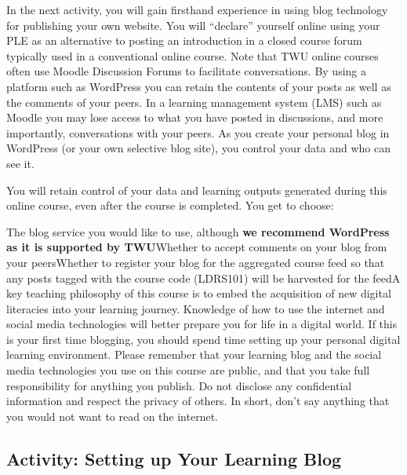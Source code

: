 \documentclass[
  letterpaper,
  DIV=11,
  numbers=noendperiod]{scrreprt}
\begin{document}
In the next activity, you will gain firsthand experience in using blog
technology for publishing your own website. You will ``declare''
yourself online using your PLE as an alternative to posting an
introduction in a closed course forum typically used in a conventional
online course. Note that TWU online courses often use Moodle Discussion
Forums to facilitate conversations. By using a platform such as
WordPress you can retain the contents of your posts as well as the
comments of your peers. In a learning management system (LMS) such as
Moodle you may lose access to what you have posted in discussions, and
more importantly, conversations with your peers. As you create your
personal blog in WordPress (or your own selective blog site), you
control your data and who can see it.

You will retain control of your data and learning outputs generated
during this online course, even after the course is completed. You get
to choose:

The blog service you would like to use, although \textbf{we recommend
WordPress as it is supported by TWU}Whether to accept comments on your
blog from your peersWhether to register your blog for the aggregated
course feed so that any posts tagged with the course code (LDRS101) will
be harvested for the feedA key teaching philosophy of this course is to
embed the acquisition of new digital literacies into your learning
journey. Knowledge of how to use the internet and social media
technologies will better prepare you for life in a digital world. If
this is your first time blogging, you should spend time setting up your
personal digital learning environment. Please remember that your
learning blog and the social media technologies you use on this course
are public, and that you take full responsibility for anything you
publish. Do not disclose any confidential information and respect the
privacy of others. In short, don't say anything that you would not want
to read on the internet.

\subsection{Activity: Setting up Your Learning
Blog}\label{activity-setting-up-your-learning-blog}
\end{document}
